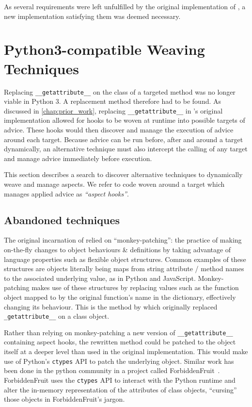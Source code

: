 As several requirements were left unfulfilled by the original implementation of
\pdsf{}, a new implementation satisfying them was deemed necessary.


\section{Python3-compatible Weaving Techniques}\label{sec:pdsf3python3}

Replacing \lstinline{__getattribute__} on the class of a targeted method was no
longer viable in Python 3. A replacement method therefore had to be found. As
discussed in \cref{chap:prior_work}, replacing \lstinline{__getattribute__} in
\pdsf{}'s original implementation allowed for hooks to be woven at runtime into
possible targets of advice. These hooks would then discover and manage the
execution of advice around each target. Because advice can be run before, after
and around a target dynamically, an alternative technique must also intercept
the calling of any target and manage advice immediately before execution. 

This section describes a search to discover alternative techniques to
dynamically weave and manage aspects.
We refer to code woven
around a target which manages applied advice as \emph{``aspect hooks''}.


\subsection{Abandoned techniques}\label{subsec:pdsf3badweaving}

The original incarnation of \pdsf{} relied on ``monkey-patching'': 
the practice of making on-the-fly changes to object
behaviours \& definitions by taking advantage of language properties such as
flexible object structures. Common examples of these structures are objects
literally being maps from string attribute / method names to the associated
underlying value, as in Python and JavaScript. Monkey-patching makes use of
these structures by replacing values such as the function object mapped to by
the original function's name in the dictionary, effectively changing its
behaviour. This is the method by which \pdsf{} originally replaced
\lstinline{_getattribute__} on a class object.

Rather than relying on monkey-patching a new version of
\lstinline{__getattribute__} containing aspect hooks, the rewritten method could
be patched to the object itself at a deeper level than used in the original
\pdsf{} implementation. This would make use of Python's \lstinline{ctypes} API
to patch the underlying object. Similar work has been done in the python
community in a project called ForbiddenFruit~\cite{forbiddenfruit_repo}.
ForbiddenFruit uses the \lstinline{ctypes} API to interact with the Python
runtime and alter the in-memory representation of the attributes of class
objects, ``cursing'' those objects in ForbiddenFruit's jargon.

